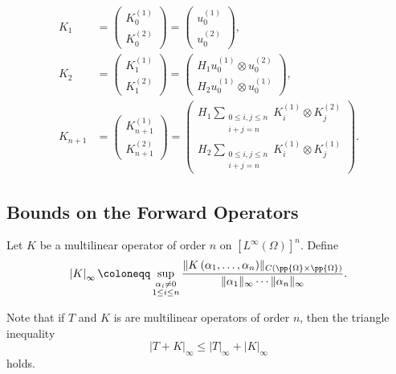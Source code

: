 \documentclass[a4paper, 12pt]{article}
\begin{document}
\begin{align}\label{fwop}
	K_1 &= \begin{pmatrix} K_0^{(1)}\\K_0^{(2)} \end{pmatrix} = \begin{pmatrix} u_0^{(1)}\\u_0^{(2)}\end{pmatrix},\nonumber\\
	K_2 &= \begin{pmatrix} K_1^{(1)}\\K_1^{(2)} \end{pmatrix} = \begin{pmatrix} H_1 u_0^{(1)}\otimes u_0^{(2)}\\H_2 u_0^{(1)} \otimes u_0^{(1)}\end{pmatrix},\nonumber\\
	K_{n + 1} &= \begin{pmatrix} K_{n + 1}^{(1)}\\K_{n + 1}^{(2)} \end{pmatrix} = \begin{pmatrix} H_1 \sum\limits_{\substack{0\le i,j\le n\\i + j = n}} K_i^{(1)}\otimes K_j^{(2)}\\H_2 \sum\limits_{\substack{0\le i,j\le n\\i + j = n}}K_i^{(1)} \otimes K_j^{(1)}\end{pmatrix}
.\end{align}

\subsection{Bounds on the Forward Operators}
\begin{defn}
	Let $K$ be a multilinear operator of order $n$ on $\left[ L^{\infty}\left( \Omega \right) \right]^{n}$. Define
\[
	\left| K \right|_{\infty}
	\coloneqq \sup_{\substack{\alpha_{i} \neq 0\\ 1\le i\le n}} \frac{\lVert K\left( \alpha_1,\ldots,\alpha_{n} \right) \rVert_{C\left( \pp{\Omega}\times \pp{\Omega} \right)}}{\lVert \alpha_1 \rVert_{\infty}\cdots \lVert \alpha_{n} \rVert_{\infty}}
.\]
\end{defn}

	Note that if $T$ and $K$ is are multilinear operators of order $n$, then the triangle inequality
	\[
	\left| T + K \right|_{\infty} \le \left| T \right|_{\infty} + \left| K \right|_{\infty}
	\] 
	holds.
\end{document}
